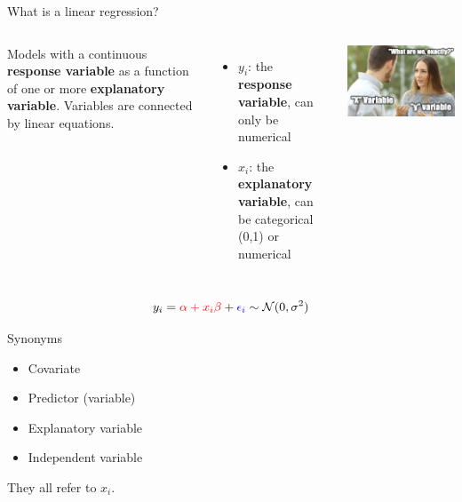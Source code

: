 \documentclass[
  ignorenonframetext,
]{beamer}
\providecommand{\tightlist}{%
  \setlength{\itemsep}{0pt}\setlength{\parskip}{0pt}}
\newcommand{\columnsbegin}{\begin{columns}}
\newcommand{\columnsend}{\end{columns}}
\begin{document}
\begin{frame}{What is a linear regression?}
\protect\hypertarget{what-is-a-linear-regression}{}
\columnsbegin
{}

Models with a continuous \textbf{response variable} as a function of one
or more \textbf{explanatory variable}. Variables are connected by linear
equations.

\begin{itemize}
\tightlist
\item
  \(y_i\): the \textbf{response variable}, can only be numerical
\item
  \(x_i\): the \textbf{explanatory variable}, can be categorical (0,1)
  or numerical
\end{itemize}


\includegraphics{xy.png}

\columnsend

\begin{equation}
y_i = \textcolor{red}{\alpha + x_i\beta} + \textcolor{blue}{\epsilon_i}\sim \mathcal{N}(0,\sigma^2)
\end{equation}
\end{frame}

\begin{frame}{Synonyms}
\protect\hypertarget{synonyms}{}
\begin{itemize}
\tightlist
\item
  Covariate
\item
  Predictor (variable)
\item
  Explanatory variable
\item
  Independent variable
\end{itemize}

They all refer to \(x_i\).
\end{frame}
\end{document}
